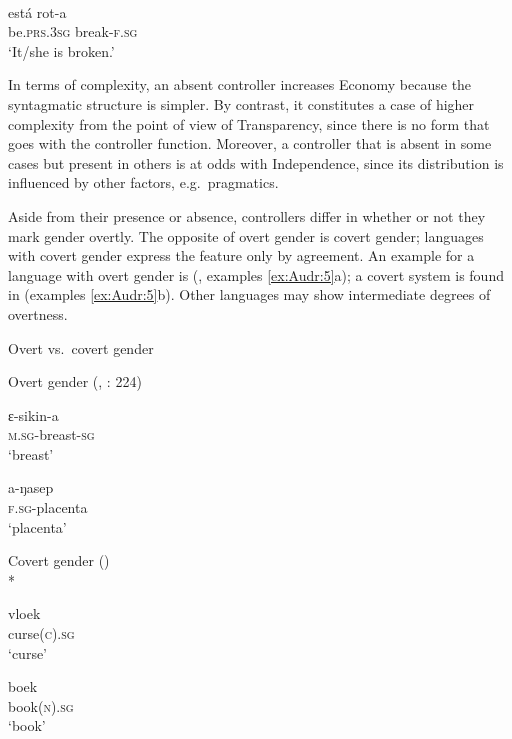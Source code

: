 \documentclass[output=collectionpaper]{langsci/langscibook}
\begin{document}
\ea
\label{ex:Audr:4}
\\
\gll está rot-a\\
     be.\textsc{prs}.\textsc{3sg} break-\textsc{f.sg}\\
\glt `It/she is broken.'
\z

In terms of complexity, an absent controller increases Economy because the syntagmatic structure is simpler. By contrast, it constitutes a case of higher complexity from the point of view of Transparency, since there is no form that goes with the controller function. Moreover, a controller that is absent in some cases but present in others is at odds with Independence, since its distribution is influenced by other factors, e.g.\ pragmatics.

Aside from their presence or absence, controllers differ in whether or not they mark gender overtly. The opposite of overt gender is covert gender; languages with covert gender express the feature only by agreement. An example for a language with overt gender is  (, examples \ref{ex:Audr:5}a); a covert system is found in  (examples \ref{ex:Audr:5}b). Other languages may show intermediate degrees of overtness.

\ea
\label{ex:Audr:5}
Overt vs.\ covert gender\\
\begin{xlist}
\ex
Overt gender (, \citealt{Dimmendaal1983}: 224)\\
\begin{minipage}[t]{0.4\textwidth}
\gll ɛ{}-sikin-a  \\
     \textsc{m.sg}{}-breast-\textsc{sg}\\
\glt `breast'\\
\end{minipage}%
\begin{minipage}[t]{0.4\textwidth}
\gll a-ŋasep\\
     \textsc{f.sg-}placenta\\
\glt `placenta'\\
\end{minipage}
\goodbreak
\ex
Covert gender ()\\*
\begin{minipage}[t]{0.4\textwidth}
\gll vloek    \\
     curse(\textsc{c).sg}\\
\glt `curse'
\end{minipage}%
\begin{minipage}[t]{0.4\textwidth}
\gll boek\\
     book(\textsc{n).sg}\\
\glt `book'
\end{minipage}
\end{xlist}
\z
\end{document}
